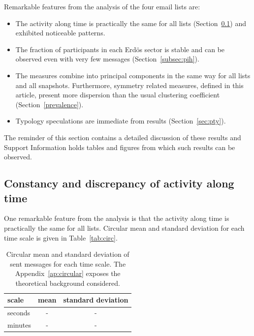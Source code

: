 \documentclass[%
 aip,
 jmp,%
 amsmath,amssymb,
 reprint,%
]{revtex4-1}
\begin{document}
Remarkable features from the analysis of the four email lists are:
\begin{itemize}
    \item The activity along time is practically the same for all lists (Section~\ref{constDisc}) and exhibited noticeable patterns.
    \item The fraction of participants in each Erd\"os sector is stable and can be observed even with very few messages (Section~\ref{subsec:pih}).
    \item The measures combine into principal components in the same way for all lists and all snapshots. 
	    Furthermore, symmetry related measures, defined in this article, present more dispersion than the usual clustering coefficient (Section~\ref{prevalence}).
    \item Typology speculations are immediate from results (Section~\ref{sec:pty}).
\end{itemize}

The reminder of this section contains a detailed discussion of these results and
Support Information holds tables and figures from which such results can be observed.

\subsection{Constancy and discrepancy of activity along time}\label{constDisc}
One remarkable feature from the analysis is that the activity 
along time is practically the same for all lists. Circular mean and standard deviation
for each time scale is given in Table~\ref{tab:circ}.

\begin{table}[t]
\scriptsize
\caption{Circular mean and standard deviation of sent messages for each time scale. The Appendix~\ref{ap:circular} exposes the theoretical background considered.}
\begin{center}
    \begin{tabular}{ |l|| c|c|}
        \hline
scale & mean & standard deviation \\ \hline
seconds & - & - \\ \hline
minutes & - & - \\ \hline
    \end{tabular}
\end{center}
\label{ano}
\end{table}
\end{document}
